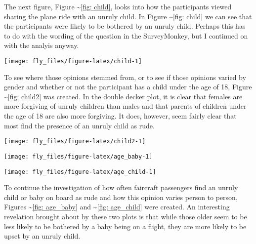 The next figure, Figure \textasciitilde{}\ref{fig: child}, looks into
how the participants viewed sharing the plane ride with an unruly child.
In Figure \textasciitilde{}\ref{fig: child} we can see that the
participants were likely to be bothered by an unruly child. Perhaps this
has to do with the wording of the question in the SurveyMonkey, but I
continued on with the analyis anyway.

\begin{Schunk}


\begin{center}\texttt{[image: fly\_files/figure-latex/child-1]} \end{center}

\end{Schunk}

To see where those opinions stemmed from, or to see if those opinions
varied by gender and whether or not the participant has a child under
the age of 18, Figure \textasciitilde{}\ref{fig: child2} was created. In
the double decker plot, it is clear that females are more forgiving of
unruly children than males and that parents of children under the age of
18 are also more forgiving. It does, however, seem fairly clear that
most find the presence of an unruly child as rude.

\begin{Schunk}


\begin{center}\texttt{[image: fly\_files/figure-latex/child2-1]} \end{center}

\end{Schunk}

\begin{Schunk}


\begin{center}\texttt{[image: fly\_files/figure-latex/age\_baby-1]} \end{center}

\end{Schunk}

\begin{Schunk}


\begin{center}\texttt{[image: fly\_files/figure-latex/age\_child-1]} \end{center}

\end{Schunk}

To continue the investigation of how often faircraft passengers find an
unruly child or baby on board as rude and how this opinion varies person
to person, Figures \textasciitilde{}\ref{fig: age_baby} and
\textasciitilde{}\ref{fig: age_child} were created. An interesting
revelation brought about by these two plots is that while those older
seem to be less likely to be bothered by a baby being on a flight, they
are more likely to be upset by an unruly child.

